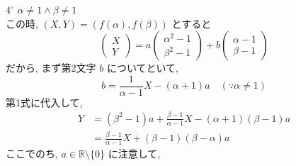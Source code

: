 \documentclass[../main.tex]{subfiles}
\begin{document}
$4^\circ$ $\alpha \neq 1 \land \beta \neq 1$\\
この時, $(X,Y) = (f(\alpha), f(\beta))$ とすると
\[
  \begin{pmatrix} X \\ Y
  \end{pmatrix} = a
  \begin{pmatrix} \alpha^2 - 1 \\ \beta^2 - 1
  \end{pmatrix} + b
  \begin{pmatrix} \alpha - 1 \\ \beta - 1
  \end{pmatrix}
\]
だから, まず第2文字 $b$ についてといて,
\[
  b = \frac{1}{\alpha-1} X - (\alpha+1)a \quad (\because \alpha \neq 1)
\]
第1式に代入して,
\[
  \begin{aligned}
    Y &= (\beta^2-1) a + \frac{\beta-1}{\alpha-1} X - (\alpha+1)(\beta-1)a \\
    &= \frac{\beta-1}{\alpha-1} X + (\beta-1)(\beta-\alpha) a
  \end{aligned}
\]
ここでのち, $a \in \mathbb{R} \setminus \{0\}$ に注意して,
\end{document}
